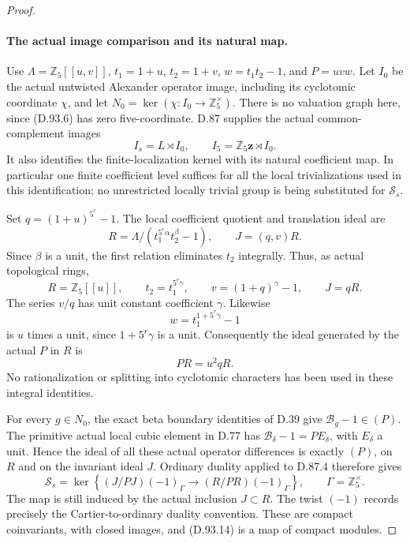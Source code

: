 \begin{proof}
\paragraph{The actual image comparison and its natural map.}
Use \(\Lambda=\mathbb Z_5[[u,v]]\), \(t_1=1+u\),
\(t_2=1+v\), \(w=t_1t_2-1\), and \(P=uvw\).
Let \(I_0\) be the actual untwisted Alexander operator image,
including its cyclotomic coordinate \(\chi\), and let
\(N_0=\ker(\chi:I_0\to\mathbb Z_5^\times)\).
There is no valuation graph here, since (D.93.6) has zero
five-coordinate. D.87 supplies the actual common-complement
images
\[
              I_s=L\rtimes I_0,\qquad
              I_5=\mathbb Z_5\mathbf z\rtimes I_0 .
                                                               \tag{D.93.10}
\]
It also identifies the finite-localization kernel with its
natural coefficient map. In particular one finite coefficient
level suffices for all the local trivializations used in this
identification; no unrestricted locally trivial group is being
substituted for \(\mathcal S_s\).

Set \(q=(1+u)^{5^r}-1\). The local coefficient quotient and
translation ideal are
\[
 R=\Lambda/(t_1^{5^r\alpha}t_2^\beta-1),
                    \qquad J=(q,v)R.                 \tag{D.93.11}
\]
Since \(\beta\) is a unit, the first relation eliminates \(t_2\)
integrally. Thus, as actual topological rings,
\[
 R=\mathbb Z_5[[u]],\qquad
 t_2=t_1^{5^r\gamma},\qquad
 v=(1+q)^\gamma-1,\qquad J=qR.                         \tag{D.93.12}
\]
The series \(v/q\) has unit constant coefficient \(\gamma\).
Likewise
\[
 w=t_1^{1+5^r\gamma}-1
\]
is \(u\) times a unit, since \(1+5^r\gamma\) is a unit.
Consequently the ideal generated by the actual \(P\) in \(R\) is
\[
                              PR=u^2qR.               \tag{D.93.13}
\]
No rationalization or splitting into cyclotomic characters
has been used in these integral identities.

For every \(g\in N_0\), the exact beta boundary identities
of D.39 give \(\mathcal B_g-1\in(P)\). The primitive actual
local cubic element in D.77 has
\(\mathcal B_\delta-1=P E_\delta\), with \(E_\delta\) a unit.
Hence the ideal of all these actual operator differences is
exactly \((P)\), on \(R\) and on the invariant ideal \(J\).
Ordinary duality applied to D.87.4 therefore gives
\[
 \mathcal S_s=
 \ker\left\{
       (J/PJ)(-1)_\Gamma\longrightarrow
       (R/PR)(-1)_\Gamma\right\},
                    \qquad \Gamma=\mathbb Z_5^\times .
                                                               \tag{D.93.14}
\]
The map is still induced by the actual inclusion \(J\subset R\).
The twist \((-1)\) records precisely the Cartier-to-ordinary
duality convention. These are compact coinvariants, with closed
images, and (D.93.14) is a map of compact modules.


\end{proof}
